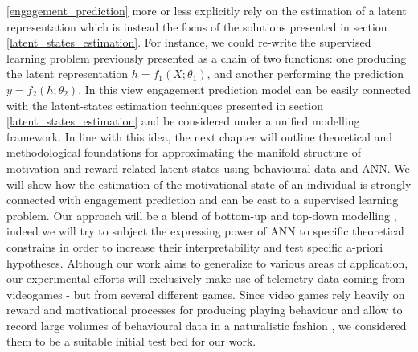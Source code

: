 \ref{engagement_prediction} more or less explicitly rely on the estimation of a latent representation which is instead the focus of the solutions presented in section \ref{latent_states_estimation}. For instance, we could re-write the supervised learning problem previously presented as a chain of two functions: one producing the latent representation $h = f_1(X; \theta_1)$, and another performing the prediction $y = f_2(h; \theta_2)$. In this view engagement prediction model can be easily connected with the latent-states estimation techniques presented in section \ref{latent_states_estimation} and be considered under a unified modelling framework. In line with this idea, the next chapter will outline theoretical and methodological foundations for approximating the manifold structure of motivation and reward related latent states using behavioural data and ANN.  We will show how the estimation of the motivational state of an individual is strongly connected with engagement prediction and can be cast to a supervised learning problem. Our approach will be a blend of bottom-up and top-down modelling \cite{yannakakis2013player}, indeed we will try to subject the expressing power of ANN to specific theoretical constrains in order to increase their interpretability and test specific a-priori hypotheses. Although our work aims to generalize to various areas of application, our experimental efforts will exclusively make use of telemetry data coming from videogames - but from several different games. Since video games rely heavily on reward and motivational processes for producing playing behaviour  \cite{chumbley2006affect,wang2011game,phillips2013videogame,avserivskis2017computational, agarwal2017quitting, steyvers2019joint} and allow to record large volumes of behavioural data in a naturalistic fashion \cite{drachen2015behavioral}, we considered them to be a suitable initial test bed for our work.